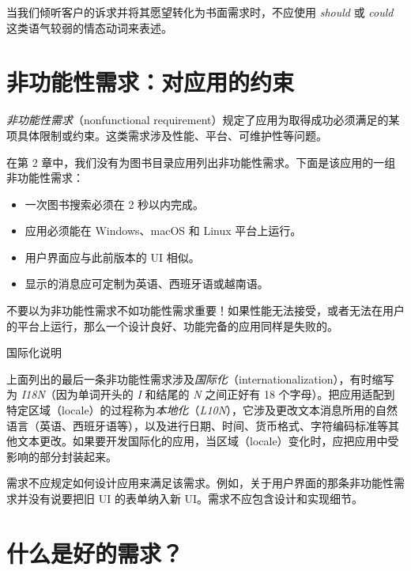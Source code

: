 当我们倾听客户的诉求并将其愿望转化为书面需求时，不应使用 \emph{should} 或 \emph{could} 这类语气较弱的情态动词来表述。


\section{非功能性需求：对应用的约束}

\emph{非功能性需求}（nonfunctional requirement）规定了应用为取得成功必须满足的某项具体限制或约束。这类需求涉及性能、平台、可维护性等问题。

在第 2 章中，我们没有为图书目录应用列出非功能性需求。下面是该应用的一组非功能性需求：

\begin{itemize}
\item 一次图书搜索必须在 2 秒以内完成。
\item 应用必须能在 Windows、macOS 和 Linux 平台上运行。
\item 用户界面应与此前版本的 UI 相似。
\item 显示的消息应可定制为英语、西班牙语或越南语。
\end{itemize}


不要以为非功能性需求不如功能性需求重要！如果性能无法接受，或者无法在用户的平台上运行，那么一个设计良好、功能完备的应用同样是失败的。

\begin{mySidebar}{国际化说明}

上面列出的最后一条非功能性需求涉及\emph{国际化}（internationalization），有时缩写为 \emph{I18N}（因为单词开头的 \emph{I} 和结尾的 \emph{N} 之间正好有 18 个字母）。把应用适配到特定区域（locale）的过程称为\emph{本地化}（\emph{L10N}），它涉及更改文本消息所用的自然语言（英语、西班牙语等），以及进行日期、时间、货币格式、字符编码标准等其他文本更改。如果要开发国际化的应用，当区域（locale）变化时，应把应用中受影响的部分封装起来。
\end{mySidebar}

需求不应规定如何设计应用来满足该需求。例如，关于用户界面的那条非功能性需求并没有说要把旧 UI 的表单纳入新 UI。需求不应包含设计和实现细节。


\section{什么是好的需求？}

